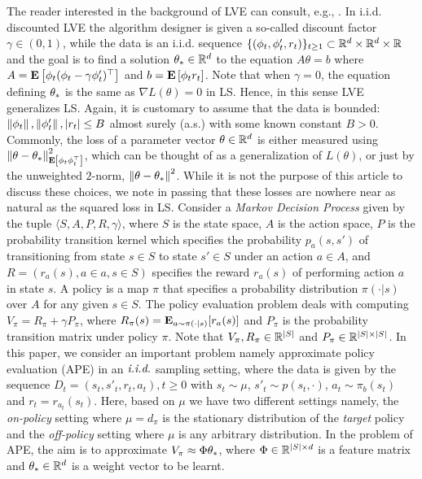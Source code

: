 \begin{example}
\label{ex:ape}
The reader interested in the background of LVE can consult, e.g., \cite{sutton,Sze10}.
In i.i.d. discounted LVE the algorithm designer is given a so-called discount factor
 $\gamma\in (0,1)$, while the data is an i.i.d. sequence $\{(\phi_t,\phi_t',r_t)\}_{t\ge 1}\subset \mathbb{R}^d \times \mathbb{R}^d \times \mathbb{R}$ and the goal is to find a solution $\theta_*\in \mathbb{R}^d$ to the equation $A \theta = b$
where $A =\mathbf{E}\left[ \phi_t(\phi_t - \gamma \phi_t')^\top\right]$ and $b =\mathbf{E}\left[ \phi_t r_t\right]$.
Note that when $\gamma=0$, the equation defining $\theta_*$ is the same as $\nabla L(\theta)=0$ in LS. 
Hence, in this sense LVE generalizes LS.
Again, it is customary to assume that the data is bounded: 
$\left\| \phi_t\right\|,\left\| \phi_t'\right\|,|r_t|\le B$ almost surely (a.s.) with some known 
constant $B>0$. 
Commonly, the loss of a parameter vector $\theta\in \mathbb{R}^d$ is either measured using $\left\| \theta-\theta_*\right\|_{\mathbf{E}\left[\phi_t \phi_t^\top\right]}^2$, which can be thought of as a generalization of $L(\theta)$, or just by
the unweighted $2$-norm, $\left\| \theta-\theta_*\right\|^2$. 
While it is not the purpose of this article to discuss these choices, we note in passing that these losses
are nowhere near as natural as the squared loss in LS.
Consider a \emph{Markov Decision Process} given by the tuple $\langle S,A,P,R,\gamma \rangle$, where $S$ is the state space, $A$ is the action space, $P$ is the probability transition kernel which specifies the probability $p_a(s,s')$ of transitioning from state $s\in S$ to state $s'\in S$ under an action $a\in A$, and $R=(r_a(s),a\in a,s\in S)$ specifies the reward $r_a(s)$ of performing action $a$ in state $s$. A policy is a map $\pi$ that specifies a probability distribution $\pi(\cdot | s)$ over $A$ for any given $s \in S$. The policy evaluation problem deals with computing $V_\pi=R_\pi+\gamma P_\pi$, where $R_\pi(s)=\mathbf{E}_{a\sim \pi(\cdot|s)}[r_a(s)]$ and $P_\pi$ is the probability transition matrix under policy $\pi$. Note that $V_\pi,R_\pi \in \mathbb{R}^{|S|}$ and $P_\pi\in\mathbb{R}^{|S|\times|S|}$. 
In this paper, we consider an important problem namely approximate policy evaluation (APE) in an $\emph{i.i.d.}$ sampling setting, where the data is given by the sequence  $D_t=(s_t,s'_t,r_t,a_t),t\geq 0$ with $s_t\sim \mu$,  $s'_t\sim p(s_t,\cdot)$, $a_t\sim\pi_b(s_t)$ and $r_t=r_{a_t}(s_t)$. Here, based on $\mu$ we have two different settings namely, the \emph{on-policy} setting where $\mu=d_{\pi}$ is the stationary distribution of  the \emph{target} policy and the \emph{off-policy} setting where $\mu$ is any arbitrary distribution. In the problem of APE, the aim is to approximate $V_\pi \approx \Phi \theta_*$, where $\Phi\in \mathbb{R}^{|S|\times d}$ is a feature matrix and $\theta_*\in\mathbb{R}^d$ is a weight vector to be learnt.

\end{example}
